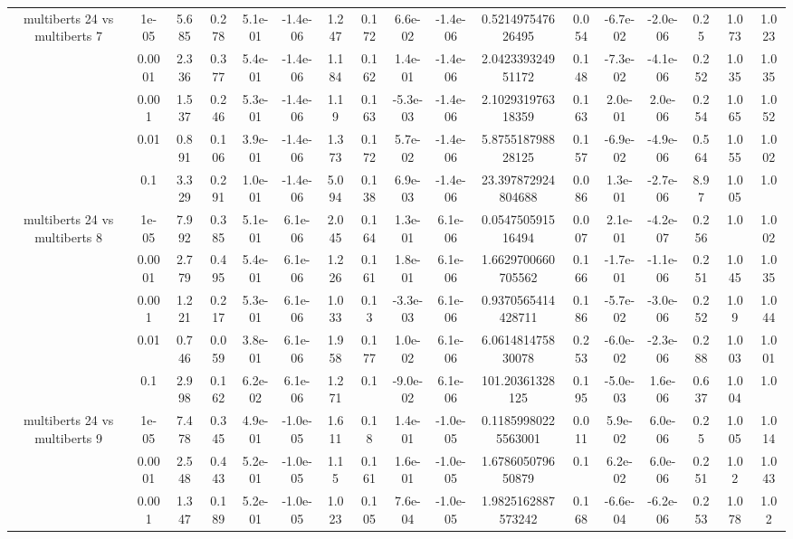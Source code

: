 \begin{tabular}{|c|c|c|c|c|c|c|c|c|c|c|c|c|c|c|c|c|}
\hline
\multirow{5}{*}{multiberts 24 vs multiberts 7} & 1e-05 & 5.685 & 0.278 & 5.1e-01 & -1.4e-06 & 1.247 & 0.172 & 6.6e-02 & -1.4e-06 & 0.521497547626495 & 0.054 & -6.7e-02 & -2.0e-06 & 0.25 & 1.073 & 1.023 \\
 & 0.0001 & 2.336 & 0.377 & 5.4e-01 & -1.4e-06 & 1.184 & 0.162 & 1.4e-01 & -1.4e-06 & 2.042339324951172 & 0.148 & -7.3e-02 & -4.1e-06 & 0.252 & 1.035 & 1.035 \\
 & 0.001 & 1.537 & 0.246 & 5.3e-01 & -1.4e-06 & 1.19 & 0.163 & -5.3e-03 & -1.4e-06 & 2.102931976318359 & 0.163 & 2.0e-01 & 2.0e-06 & 0.254 & 1.065 & 1.052 \\
 & 0.01 & 0.891 & 0.106 & 3.9e-01 & -1.4e-06 & 1.373 & 0.172 & 5.7e-02 & -1.4e-06 & 5.875518798828125 & 0.157 & -6.9e-02 & -4.9e-06 & 0.564 & 1.055 & 1.002 \\
 & 0.1 & 3.329 & 0.291 & 1.0e-01 & -1.4e-06 & 5.094 & 0.138 & 6.9e-03 & -1.4e-06 & 23.397872924804688 & 0.086 & 1.3e-01 & -2.7e-06 & 8.97 & 1.005 & 1.0 \\
\hline
\multirow{5}{*}{multiberts 24 vs multiberts 8} & 1e-05 & 7.992 & 0.385 & 5.1e-01 & 6.1e-06 & 2.045 & 0.164 & 1.3e-01 & 6.1e-06 & 0.054750591516494 & 0.007 & 2.1e-01 & -4.2e-07 & 0.256 & 1.0 & 1.002 \\
 & 0.0001 & 2.779 & 0.495 & 5.4e-01 & 6.1e-06 & 1.226 & 0.161 & 1.8e-01 & 6.1e-06 & 1.6629700660705562 & 0.166 & -1.7e-01 & -1.1e-06 & 0.251 & 1.045 & 1.035 \\
 & 0.001 & 1.221 & 0.217 & 5.3e-01 & 6.1e-06 & 1.033 & 0.13 & -3.3e-03 & 6.1e-06 & 0.9370565414428711 & 0.186 & -5.7e-02 & -3.0e-06 & 0.252 & 1.09 & 1.044 \\
 & 0.01 & 0.746 & 0.059 & 3.8e-01 & 6.1e-06 & 1.958 & 0.177 & 1.0e-02 & 6.1e-06 & 6.061481475830078 & 0.253 & -6.0e-02 & -2.3e-06 & 0.288 & 1.003 & 1.001 \\
 & 0.1 & 2.998 & 0.162 & 6.2e-02 & 6.1e-06 & 1.271 & 0.1 & -9.0e-02 & 6.1e-06 & 101.20361328125 & 0.195 & -5.0e-03 & 1.6e-06 & 0.637 & 1.004 & 1.0 \\
\hline
\multirow{5}{*}{multiberts 24 vs multiberts 9} & 1e-05 & 7.478 & 0.345 & 4.9e-01 & -1.0e-05 & 1.611 & 0.18 & 1.4e-01 & -1.0e-05 & 0.11859980225563001 & 0.011 & 5.9e-02 & 6.0e-06 & 0.25 & 1.005 & 1.014 \\
 & 0.0001 & 2.548 & 0.443 & 5.2e-01 & -1.0e-05 & 1.15 & 0.161 & 1.6e-01 & -1.0e-05 & 1.678605079650879 & 0.1 & 6.2e-02 & 6.0e-06 & 0.251 & 1.02 & 1.043 \\
 & 0.001 & 1.347 & 0.189 & 5.2e-01 & -1.0e-05 & 1.023 & 0.105 & 7.6e-04 & -1.0e-05 & 1.9825162887573242 & 0.168 & -6.6e-04 & -6.2e-06 & 0.253 & 1.078 & 1.02 \\

\end{tabular}
